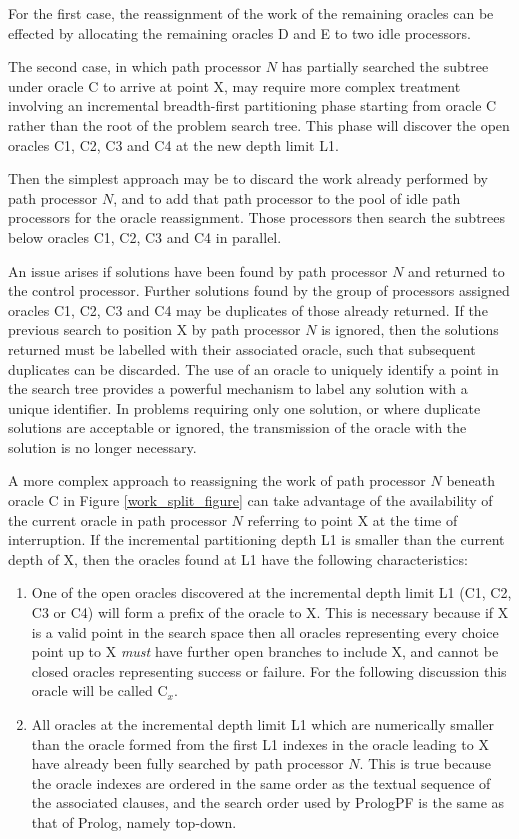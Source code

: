 For the first case, the reassignment of the work of the remaining oracles can be
effected by allocating the remaining oracles D and E to two idle processors.

The second case, in which path processor $N$ has partially searched the subtree
under oracle C to arrive at point X, may require more complex treatment
involving an incremental breadth-first partitioning phase starting from oracle C
rather than the root of the problem search tree.  This phase will discover the
open oracles C1, C2, C3 and C4 at the new depth limit L1.

Then the simplest approach may be to discard the work already performed
by path processor $N$, and to add that path processor to the pool of idle path
processors for the oracle reassignment.  Those processors then search the subtrees
below oracles C1, C2, C3 and C4 in parallel.

An issue arises if solutions have been found by path processor $N$ and returned
to the control processor.  Further solutions found by the group of processors
assigned oracles C1, C2, C3 and C4 may be duplicates of those already returned.
If the previous search to position X
by path processor $N$ is ignored, then the solutions returned must be labelled with
their associated oracle, such that subsequent duplicates can be discarded.  The use
of an oracle to uniquely identify a point in the search tree provides a powerful
mechanism to label any solution with a unique identifier.  In problems requiring
only one solution, or where duplicate solutions are acceptable or ignored, the
transmission of the oracle with the solution is no longer necessary.

A more complex approach to reassigning the work of path processor $N$ beneath oracle
C in Figure \ref{work_split_figure} can take advantage of the
availability of the current oracle in path processor $N$ referring to point X at the
time of interruption.  If the incremental partitioning depth L1 is smaller than
the current depth of X, then the oracles found at L1 have the following characteristics:
\begin{enumerate}
\item{One of the open oracles discovered at the incremental depth limit L1 
 (C1, C2, C3 or C4) will form a prefix of
  the oracle to X.  This is necessary
  because if X is a valid point in the search space then all oracles representing every
  choice point up to X \textit{must} have further open branches to include X, and 
  cannot be closed oracles representing success or failure.  For the following
  discussion this oracle will be called C$_x$.}
\item{All oracles at the incremental depth limit L1 which are numerically smaller than
  the oracle formed from the first L1 indexes in the oracle leading to X have already
  been fully searched by path processor $N$.  This is true because the oracle indexes are
  ordered in the same order as the textual sequence of the associated clauses, and the
  search order used by PrologPF is the same as that of Prolog, namely top-down.}
\end{enumerate}


